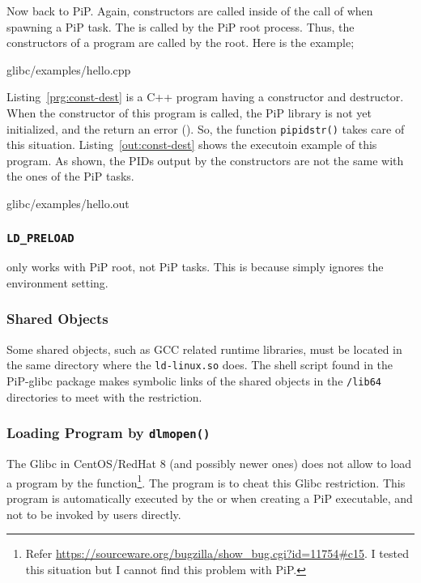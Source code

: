 Now back to PiP. Again, constructors are called inside
of the call of  when spawning a PiP task. The
 is called by the PiP root process. Thus, the
constructors of a program are called by the root. Here is the example;

 {glibc/examples/hello.cpp}

Listing~\ref{prg:const-dest} is a C++ program having a constructor and
destructor. When the constructor of this program is called, the PiP
library is not yet initialized, and the 
return an error (). So, the function {\tt pipidstr()} takes
care of this situation. Listing~\ref{out:const-dest} shows the
executoin example of this program. As shown, the PIDs output by the
constructors are not the same with the ones of the PiP tasks. 

 {glibc/examples/hello.out}

\subsubsection{{\tt LD_PRELOAD}}

 only works with PiP root, not PiP tasks. This is
because  simply ignores the 
environment setting.

\subsubsection{Shared Objects}

Some shared objects, such as GCC related runtime libraries, must be
located in the same directory where the {\tt ld-linux.so}
does. The  shell script found in the PiP-glibc
package makes symbolic links of the shared objects in the {\tt /lib64}
directories to meet with the restriction.

\subsubsection{Loading Program by {\tt dlmopen()}}

The Glibc in CentOS/RedHat 8 (and possibly newer ones) does not allow
to load a program by the  function\footnote{Refer
\url{https://sourceware.org/bugzilla/show_bug.cgi?id=11754\#c15}. I
tested this situation but I cannot find this problem with PiP.}. The
 program is to cheat this Glibc restriction. This
program is automatically executed by the  or
 when creating a PiP executable, and not to be invoked
by users directly.

